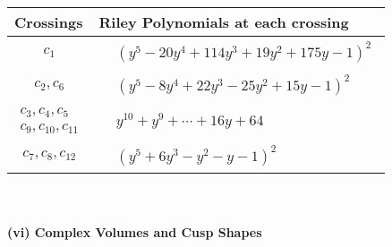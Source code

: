 \documentclass[1p]{elsarticle_modified}
\theoremstyle{definition}
\begin{document}
\begin{tabular}{m{50pt}|m{274pt}}
Crossings & \hspace{64pt}Riley Polynomials at each crossing \\
\hline $$\begin{aligned}c_{1}\end{aligned}$$&$\begin{aligned}
&(y^5-20 y^4+114 y^3+19 y^2+175 y-1)^2
\end{aligned}$\\
\hline $$\begin{aligned}c_{2},c_{6}\end{aligned}$$&$\begin{aligned}
&(y^5-8 y^4+22 y^3-25 y^2+15 y-1)^2
\end{aligned}$\\
\hline $$\begin{aligned}c_{3},c_{4},c_{5}\\c_{9},c_{10},c_{11}\end{aligned}$$&$\begin{aligned}
&y^{10}+y^9+\cdots+16 y+64
\end{aligned}$\\
\hline $$\begin{aligned}c_{7},c_{8},c_{12}\end{aligned}$$&$\begin{aligned}
&(y^5+6 y^3- y^2- y-1)^2
\end{aligned}$\\
\hline
\end{tabular}\\~\\
\newpage\flushleft \textbf{(vi) Complex Volumes and Cusp Shapes}
\end{document}
